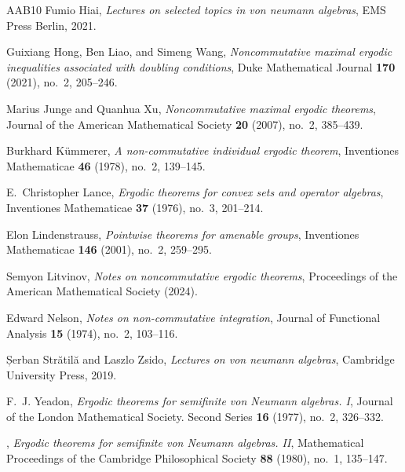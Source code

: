 \documentclass[11pt]{amsart}
\theoremstyle{definition}
\theoremstyle{myremark}
\numberwithin{equation}{section}
\begin{document}
\begin{thebibliography}{AAB{\etalchar{+}}10}
	Fumio Hiai, \emph{Lectures on selected topics in von neumann algebras}, EMS
	Press Berlin, 2021.
	
	Guixiang Hong, Ben Liao, and Simeng Wang, \emph{Noncommutative maximal ergodic
		inequalities associated with doubling conditions}, Duke Mathematical Journal
	\textbf{170} (2021), no.~2, 205--246. 
	
	Marius Junge and Quanhua Xu, \emph{Noncommutative maximal ergodic theorems},
	Journal of the American Mathematical Society \textbf{20} (2007), no.~2,
	385--439. 
	
	Burkhard K\"{u}mmerer, \emph{A non-commutative individual ergodic theorem},
	Inventiones Mathematicae \textbf{46} (1978), no.~2, 139--145. 
	
	E.~Christopher Lance, \emph{Ergodic theorems for convex sets and operator
		algebras}, Inventiones Mathematicae \textbf{37} (1976), no.~3, 201--214.
	
	Elon Lindenstrauss, \emph{Pointwise theorems for amenable groups}, Inventiones
	Mathematicae \textbf{146} (2001), no.~2, 259--295. 
	
	Semyon Litvinov, \emph{Notes on noncommutative ergodic theorems}, Proceedings
	of the American Mathematical Society (2024).
	
	Edward Nelson, \emph{Notes on non-commutative integration}, Journal of
	Functional Analysis \textbf{15} (1974), no.~2, 103--116.
	
	Șerban Str{\u{a}}til{\u{a}} and Laszlo Zsido, \emph{Lectures on von neumann
		algebras}, Cambridge University Press, 2019.
	
	F.~J. Yeadon, \emph{Ergodic theorems for semifinite von {N}eumann algebras.
		{I}}, Journal of the London Mathematical Society. Second Series \textbf{16}
	(1977), no.~2, 326--332. 
	
	\bysame, \emph{Ergodic theorems for semifinite von {N}eumann algebras. {II}},
	Mathematical Proceedings of the Cambridge Philosophical Society \textbf{88}
	(1980), no.~1, 135--147. 
	
\end{thebibliography}




	
\end{document}
